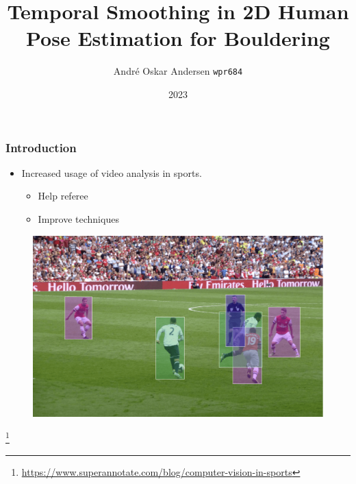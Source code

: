 \documentclass{beamer}
\begin{document}
\beamertemplatenavigationsymbolsempty

\title{Temporal Smoothing in 2D Human Pose Estimation for Bouldering}

\author{André Oskar Andersen
\newline \small \texttt{wpr684}}


\date{2023}

\newcommand\unfootnote[1]{%
  \begingroup
  \renewcommand\thefootnote{}\footnote{#1}%
  \addtocounter{footnote}{-1}%
  \endgroup
}

\frame{\titlepage}

\begin{frame}
    \frametitle{Introduction}
    \begin{minipage}{0.5\textwidth}
        \begin{itemize}
            \item<1-> Increased usage of video analysis in sports.
            \begin{itemize}
                \item Help referee
                \item Improve techniques
            \end{itemize}
        \end{itemize}
    \end{minipage} \hfill
    \begin{minipage}{0.45\textwidth}
        \begin{figure}
            \center
            \includegraphics[width = \textwidth]{./entities/soccer_cv.png}
        \end{figure}
    \end{minipage}
    \unfootnote{\tiny \url{https://www.superannotate.com/blog/computer-vision-in-sports}}
\end{frame}
\end{document}
